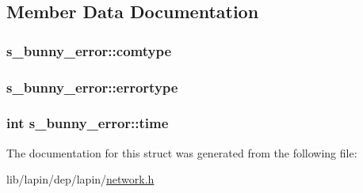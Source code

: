 \subsection{Member Data Documentation}
\hypertarget{structs__bunny__error_a7cb1f2ded1b125ee5162842ee18488cc}{
\subsubsection[{comtype}]{ s\-\_\-bunny\-\_\-error\-::comtype}}\label{structs__bunny__error_a7cb1f2ded1b125ee5162842ee18488cc}
\hypertarget{structs__bunny__error_a88f14e08a33d700bd2c490de186a386c}{
\subsubsection[{errortype}]{ s\-\_\-bunny\-\_\-error\-::errortype}}\label{structs__bunny__error_a88f14e08a33d700bd2c490de186a386c}
\hypertarget{structs__bunny__error_a57069536d3cf2d75081b770d3f2205b7}{
\subsubsection[{time}]{ {\bf int} s\-\_\-bunny\-\_\-error\-::time}}\label{structs__bunny__error_a57069536d3cf2d75081b770d3f2205b7}


The documentation for this struct was generated from the following file\-:\begin{DoxyCompactItemize}
\item 
lib/lapin/dep/lapin/\hyperlink{network_8h}{network.\-h}\end{DoxyCompactItemize}
